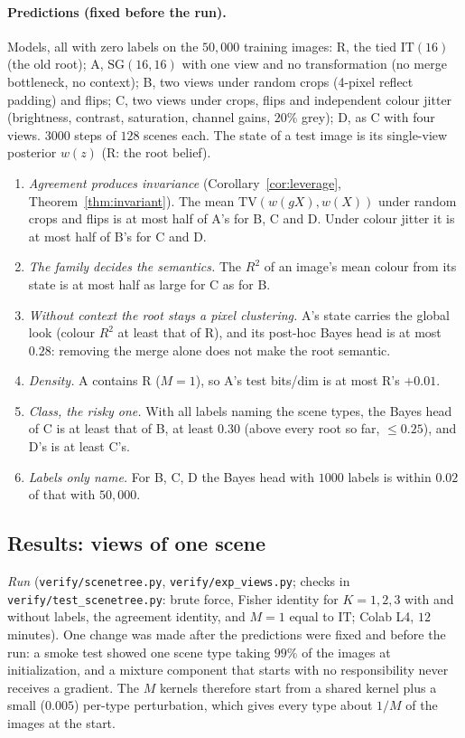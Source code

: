 \documentclass[11pt]{article}
\theoremstyle{definition}
\begin{document}
\paragraph{Predictions (fixed before the run).} Models, all with zero labels on the $50{,}000$ training images: R, the
tied $\mathrm{IT}(16)$ (the old root); A, $\mathrm{SG}(16,16)$ with one view and no transformation (no merge bottleneck,
no context); B, two views under random crops (4-pixel reflect padding) and flips; C, two views under crops, flips and
independent colour jitter (brightness, contrast, saturation, channel gains, $20\%$ grey); D, as C with four views.
$3000$ steps of $128$ scenes each. The state of a test image is its single-view posterior $w(z)$ (R: the root belief).
\begin{enumerate}
\item[(W1)] \emph{Agreement produces invariance} (Corollary~\ref{cor:leverage}, Theorem~\ref{thm:invariant}). The mean
$\mathrm{TV}(w(gX),w(X))$ under random crops and flips is at most half of A's for B, C and D. Under colour jitter it is at
most half of B's for C and D.
\item[(W2)] \emph{The family decides the semantics.} The $R^2$ of an image's mean colour from its state is at most half
as large for C as for B.
\item[(W3)] \emph{Without context the root stays a pixel clustering.} A's state carries the global look (colour
$R^2$ at least that of R), and its post-hoc Bayes head is at most $0.28$: removing the merge alone does not make the
root semantic.
\item[(W4)] \emph{Density.} A contains R ($M=1$), so A's test bits/dim is at most R's $+0.01$.
\item[(W5)] \emph{Class, the risky one.} With all labels naming the scene types, the Bayes head of C is at least that of
B, at least $0.30$ (above every root so far, $\le0.25$), and D's is at least C's.
\item[(W6)] \emph{Labels only name.} For B, C, D the Bayes head with $1000$ labels is within $0.02$ of that with
$50{,}000$.
\end{enumerate}

\subsection{Results: views of one scene}\label{sec:views-res}
\emph{Run} (\texttt{verify/scenetree.py}, \texttt{verify/exp\_views.py}; checks in \texttt{verify/test\_scenetree.py}:
brute force, Fisher identity for $K=1,2,3$ with and without labels, the agreement identity, and $M=1$ equal to
$\mathrm{IT}$; Colab L4, $12$ minutes). One change was made after the predictions were fixed and before the run: a smoke test
showed one scene type taking $99\%$ of the images at initialization, and a mixture component that starts with no
responsibility never receives a gradient. The $M$ kernels therefore start from a shared kernel plus a small ($0.005$) per-type
perturbation, which gives every type about $1/M$ of the images at the start.
\end{document}
